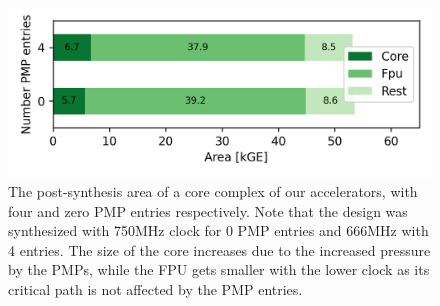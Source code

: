 \begin{figure}
    \centering
    \includegraphics[width=0.9\linewidth]{chapters/PIE/images/graphs/areasnitch.png}
    \vspace{-1em}
    \caption{The post-synthesis area of a core complex of our accelerators, with four and zero PMP entries respectively. Note that the design was synthesized with 750MHz clock for 0 PMP entries and 666MHz with 4 entries. The size of the core increases due to the increased pressure by the PMPs, while the FPU gets smaller with the lower clock as its critical path is not affected by the PMP entries.}
    \label{fig:areasnitch}
\end{figure}

\setcounter{para}{0}



